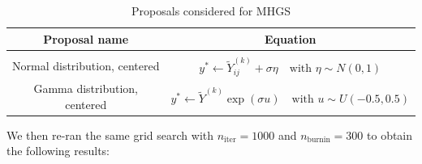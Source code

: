\documentclass[12pt]{memoir}
\newcommand{\nitern}[1]{$n_{\text{iter}}=#1$}
\newcommand{\nburninn}[1]{$n_{\text{burnin}}=#1$}
\begin{document}
\begin{table}[H]


    \begin{center}

        \begin{tabular}{|c|c|}

            \hline

            Proposal name & Equation\\

            \hline\hline

             & \\[-10pt]

            Normal distribution, centered & $y^* \gets \tilde Y^{(k)}_{ij} + \sigma {\eta} \quad\text{with } \eta \sim N(0,1)$\\

            Gamma distribution, centered & $y^* \gets \tilde Y^{(k)} \exp (\sigma u)\quad \text{with } {u} \sim U(-0.5, 0.5)$\\\hline

        \end{tabular}

\end{center}

\caption{Proposals considered for MHGS}

\label{table:proposal-comp-mhgs}

\end{table}

We then re-ran the same grid search with \nitern{1000} and \nburninn{300} to obtain the following results:
\end{document}

